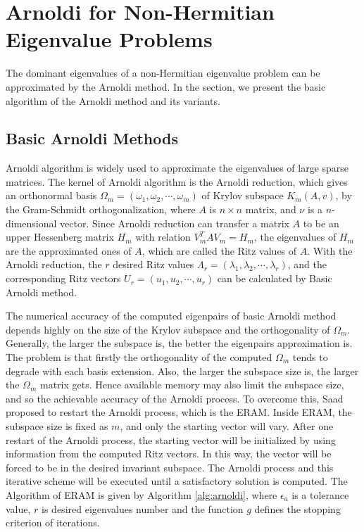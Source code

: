 \section{Arnoldi for Non-Hermitian Eigenvalue Problems}

The dominant eigenvalues of a non-Hermitian eigenvalue problem can be approximated by the Arnoldi method. In the section, we present the basic algorithm of the Arnoldi method and its variants.

\subsection{Basic Arnoldi Methods}
Arnoldi algorithm \cite{arnoldi1951principle} is widely used to approximate the eigenvalues of large sparse matrices. The kernel of Arnoldi algorithm is the Arnoldi reduction, which gives an orthonormal basis \(\Omega_m = (\omega_1,\omega_2,\cdots,\omega_m)\) of Krylov subspace \(K_m(A,v)\), by the Gram-Schmidt orthogonalization, where \(A\) is  \(n \times n\) matrix, and $\nu$ is a \(n\)-dimensional vector. Since Arnoldi reduction can transfer a matrix \(A\) to be an upper Hessenberg matrix \(H_m\) with relation $V_m^T A V_m = H_m$, the eigenvalues of \(H_m\) are the approximated ones of \(A\), which are called the Ritz values of \(A\). With the Arnoldi reduction, the $r$ desired Ritz values $\Lambda_r=(\lambda_1,\lambda_2,\cdots,\lambda_r)$, and the corresponding Ritz vectors $U_r=(u_1,u_2,\cdots,u_r)$ can be calculated by Basic Arnoldi method.

The numerical accuracy of the computed eigenpairs of basic Arnoldi method depends highly on the size of the Krylov subspace and the orthogonality of $\Omega_m$. Generally, the larger the subspace is, the better the eigenpairs approximation is. The problem is that firstly the orthogonality of the computed $\Omega_m$ tends to degrade with each basis extension. Also, the larger the subspace size is, the larger the $\Omega_m$ matrix gets. Hence available memory may also limit the subspace size, and so the achievable accuracy of the Arnoldi process. To overcome this, Saad \cite{saad2011numerical} proposed to restart the Arnoldi process, which is the ERAM. Inside ERAM, the subspace size is fixed as $m$, and only the starting vector will vary. After one restart of the Arnoldi process, the starting vector will be initialized by using information from the computed Ritz vectors. In this way, the vector will be forced to be in the desired invariant subspace. The Arnoldi process and this iterative scheme will be executed until a satisfactory solution is computed. The Algorithm of ERAM is given by Algorithm \ref{alg:arnoldi}, where $\epsilon_a$ is a tolerance value, $r$ is desired eigenvalues number and the function $g$ defines the stopping criterion of iterations.

